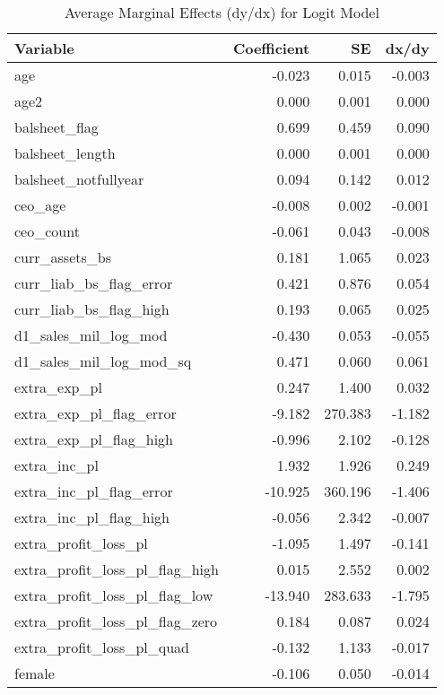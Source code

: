\begin{table}

\caption{\label{tab:}Average Marginal Effects (dy/dx) for Logit Model}
\centering
\begin{tabular}[t]{l|r|r|r}
\hline
Variable & Coefficient & SE & dx/dy\\
\hline
age & -0.023 & 0.015 & -0.003\\
\hline
age2 & 0.000 & 0.001 & 0.000\\
\hline
balsheet\_flag & 0.699 & 0.459 & 0.090\\
\hline
balsheet\_length & 0.000 & 0.001 & 0.000\\
\hline
balsheet\_notfullyear & 0.094 & 0.142 & 0.012\\
\hline
ceo\_age & -0.008 & 0.002 & -0.001\\
\hline
ceo\_count & -0.061 & 0.043 & -0.008\\
\hline
curr\_assets\_bs & 0.181 & 1.065 & 0.023\\
\hline
curr\_liab\_bs\_flag\_error & 0.421 & 0.876 & 0.054\\
\hline
curr\_liab\_bs\_flag\_high & 0.193 & 0.065 & 0.025\\
\hline
d1\_sales\_mil\_log\_mod & -0.430 & 0.053 & -0.055\\
\hline
d1\_sales\_mil\_log\_mod\_sq & 0.471 & 0.060 & 0.061\\
\hline
extra\_exp\_pl & 0.247 & 1.400 & 0.032\\
\hline
extra\_exp\_pl\_flag\_error & -9.182 & 270.383 & -1.182\\
\hline
extra\_exp\_pl\_flag\_high & -0.996 & 2.102 & -0.128\\
\hline
extra\_inc\_pl & 1.932 & 1.926 & 0.249\\
\hline
extra\_inc\_pl\_flag\_error & -10.925 & 360.196 & -1.406\\
\hline
extra\_inc\_pl\_flag\_high & -0.056 & 2.342 & -0.007\\
\hline
extra\_profit\_loss\_pl & -1.095 & 1.497 & -0.141\\
\hline
extra\_profit\_loss\_pl\_flag\_high & 0.015 & 2.552 & 0.002\\
\hline
extra\_profit\_loss\_pl\_flag\_low & -13.940 & 283.633 & -1.795\\
\hline
extra\_profit\_loss\_pl\_flag\_zero & 0.184 & 0.087 & 0.024\\
\hline
extra\_profit\_loss\_pl\_quad & -0.132 & 1.133 & -0.017\\
\hline
female & -0.106 & 0.050 & -0.014\\

\end{tabular}
\end{table}
